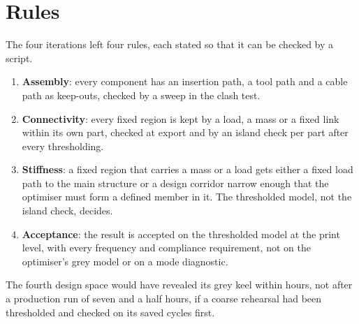 \section{Rules}\label{sec:iter-rules}

The four iterations left four rules, each stated so that it can be checked by a script.
\begin{enumerate}
\item \textbf{Assembly}: every component has an insertion path, a tool path and a cable path as keep-outs, checked by a sweep in the clash test.
\item \textbf{Connectivity}: every fixed region is kept by a load, a mass or a fixed link within its own part, checked at export and by an island check per part after every thresholding.
\item \textbf{Stiffness}: a fixed region that carries a mass or a load gets either a fixed load path to the main structure or a design corridor narrow enough that the optimiser must form a defined member in it. The thresholded model, not the island check, decides.
\item \textbf{Acceptance}: the result is accepted on the thresholded model at the print level, with every frequency and compliance requirement, not on the optimiser's grey model or on a mode diagnostic.
\end{enumerate}
The fourth design space would have revealed its grey keel within hours, not after a production run of seven and a half hours, if a coarse rehearsal had been thresholded and checked on its saved cycles first.
